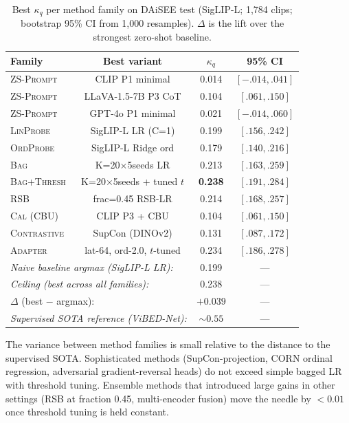 \begin{table}[t]
\caption{Best $\kappa_q$ per method family on DAiSEE test
(SigLIP-L; 1,784 clips; bootstrap 95\% CI from 1,000 resamples).
$\Delta$ is the lift over the strongest zero-shot baseline.}
\label{tab:exhaustion}
\centering
\small
\begin{tabular}{lccc}
\toprule
Family & Best variant & $\kappa_q$ & 95\% CI \\
\midrule
\textsc{ZS-Prompt} & CLIP P1 minimal & 0.014 & $[-.014, .041]$\\
\textsc{ZS-Prompt} & LLaVA-1.5-7B P3 CoT & 0.104 & $[.061, .150]$\\
\textsc{ZS-Prompt} & GPT-4o P1 minimal & 0.021 & $[-.014, .060]$\\
\textsc{LinProbe} & SigLIP-L LR (C=1) & 0.199 & $[.156, .242]$\\
\textsc{OrdProbe} & SigLIP-L Ridge ord & 0.179 & $[.140, .216]$\\
\textsc{Bag} & K=20$\times$5seeds LR & 0.213 & $[.163, .259]$\\
\textsc{Bag+Thresh} & K=20$\times$5seeds + tuned $t$ & \textbf{0.238} & $[.191, .284]$\\
\textsc{RSB} & frac=0.45 RSB-LR & 0.214 & $[.168, .257]$\\
\textsc{Cal (CBU)} & CLIP P3 + CBU & 0.104 & $[.061, .150]$\\
\textsc{Contrastive} & SupCon (DINOv2) & 0.131 & $[.087, .172]$\\
\textsc{Adapter} & lat-64, ord-2.0, $t$-tuned & 0.234 & $[.186, .278]$\\
\midrule
\multicolumn{2}{l}{\emph{Naive baseline argmax (SigLIP-L LR):}} & 0.199 & --- \\
\multicolumn{2}{l}{\emph{Ceiling (best across all families):}} & 0.238 & --- \\
\multicolumn{2}{l}{$\Delta$ (best $-$ argmax):} & $+0.039$ & --- \\
\multicolumn{2}{l}{\emph{Supervised SOTA reference (ViBED-Net):}} & $\sim 0.55$ & --- \\
\bottomrule
\end{tabular}
\end{table}

The variance between method families is small relative to the
distance to the supervised SOTA. Sophisticated methods
(SupCon-projection, CORN ordinal regression, adversarial
gradient-reversal heads) do not exceed simple bagged LR with
threshold tuning. Ensemble methods that introduced large gains in
other settings (RSB at fraction 0.45, multi-encoder fusion) move
the needle by $<\!0.01$ once threshold tuning is held constant.

